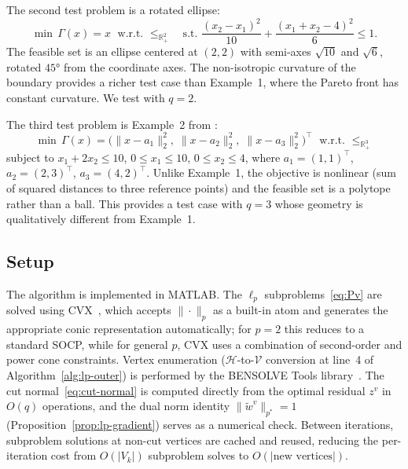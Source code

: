 \documentclass[11pt]{article}
\newcommand{\R}{\mathbb{R}}
\newcommand{\pstar}{p^*}
\begin{document}
The second test problem is a rotated ellipse:
\begin{equation}\label{eq:rotated-ellipse}
\min\, \Gamma(x) = x \;\text{ w.r.t.\ } \le_{\R^2_+} \quad \text{s.t. } \frac{(x_2 - x_1)^2}{10} + \frac{(x_1 + x_2 - 4)^2}{6} \le 1.
\end{equation}
The feasible set is an ellipse centered at $(2, 2)$ with semi-axes $\sqrt{10}$ and $\sqrt{6}$, rotated $45°$ from the coordinate axes. The non-isotropic curvature of the boundary provides a richer test case than Example~1, where the Pareto front has constant curvature. We test with $q = 2$.

The third test problem is Example~2 from \cite[Section~8]{Ararat2024}:
\begin{equation}\label{eq:example2}
\min\, \Gamma(x) = \bigl(\|x - a_1\|_2^2,\; \|x - a_2\|_2^2,\; \|x - a_3\|_2^2\bigr)^\top \;\text{ w.r.t.\ } \le_{\R^3_+}
\end{equation}
subject to $x_1 + 2x_2 \le 10$, $0 \le x_1 \le 10$, $0 \le x_2 \le 4$, where $a_1 = (1,1)^\top$, $a_2 = (2,3)^\top$, $a_3 = (4,2)^\top$. Unlike Example~1, the objective is nonlinear (sum of squared distances to three reference points) and the feasible set is a polytope rather than a ball. This provides a test case with $q = 3$ whose geometry is qualitatively different from Example~1.

\subsection{Setup}\label{sec:setup}

The algorithm is implemented in MATLAB. The $\ell_p$ subproblems~\eqref{eq:Pv} are solved using CVX~\cite{cvx}, which accepts $\|\cdot\|_p$ as a built-in atom and generates the appropriate conic representation automatically; for $p = 2$ this reduces to a standard SOCP, while for general $p$, CVX uses a combination of second-order and power cone constraints. Vertex enumeration ($\mathcal{H}$-to-$\mathcal{V}$ conversion at line~4 of Algorithm~\ref{alg:lp-outer}) is performed by the BENSOLVE Tools library~\cite{bensolve}. The cut normal~\eqref{eq:cut-normal} is computed directly from the optimal residual $z^v$ in $O(q)$ operations, and the dual norm identity $\|\tilde{w}^v\|_{\pstar} = 1$ (Proposition~\ref{prop:lp-gradient}) serves as a numerical check. Between iterations, subproblem solutions at non-cut vertices are cached and reused, reducing the per-iteration cost from $O(|V_k|)$ subproblem solves to $O(|\text{new vertices}|)$.
\end{document}
